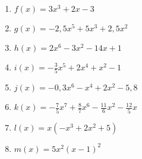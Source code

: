 \begin{Exercise}[title={Gib das Verhalten für \(x\to \pm \infty \) an}, label=ganzVerA1]
	
	\begin{minipage}{\textwidth}
		\begin{minipage}{0.5\textwidth}
			\begin{enumerate}[label=\alph*)]
				\item \(f(x)=3x^3+2x-3\)
				\item \(g(x)=-2,5x^5+5x^3+2,5x^2\)
				\item \(h(x)=2x^6-3x^2-14x+1\)
				\item \(i(x)=-\frac{3}{5}x^5+2x^4+x^2-1\)
			\end{enumerate}
		\end{minipage}%
		\begin{minipage}{0.5\textwidth}
			\begin{enumerate}[label=\alph*)]
				\setcounter{enumi}{4}
				\item \(j(x)=-0,3x^6-x^4+2x^2-5,8\)
				\item \(k(x)=-\frac{7}{5}x^7+\frac{8}{7}x^6-\frac{11}{6}x^2-\frac{12}{5}x\)
				\item \(l(x)=x\left(-x^3+2x^2+5\right)\)
				\item \(m(x)=5x^2\left(x-1\right)^2\)
			\end{enumerate}
		\end{minipage}%
	\end{minipage}
\end{Exercise}
\newpage
